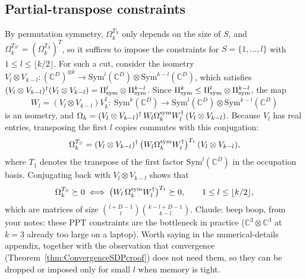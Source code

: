 \documentclass[aps,pra,twocolumn,showpacs,superscriptaddress,groupedaddress]{revtex4-2}
\newcommand{\claude}[1]{{\color{claudeorange} Claude: beep boop, #1}}
\newcommand{\C}{\mathds{C}}
\begin{document}
\begin{widetext}
\subsection{Partial-transpose constraints}
By permutation symmetry, $\Omega_k^{T_S}$ only depends on the size of $S$, and $\Omega_k^{T_{S^c}}=(\Omega_k^{T_S})^T$, so it suffices to impose the constraints for $S=\{1,\dots,l\}$ with $1\leq l\leq\lfloor k/2\rfloor$. For such a cut, consider the isometry $V_l\otimes V_{k-l}:(\C^D)^{\otimes k}\to\text{Sym}^l(\C^D)\otimes\text{Sym}^{k-l}(\C^D)$, which satisfies $(V_l\otimes V_{k-l})^\dagger(V_l\otimes V_{k-l})=\Pi^l_{\rm sym}\otimes\Pi^{k-l}_{\rm sym}$. Since $\Pi^k_{\rm sym}\leq\Pi^l_{\rm sym}\otimes\Pi^{k-l}_{\rm sym}$, the map
\begin{equation}
    W_l=(V_l\otimes V_{k-l})V_k^\dagger:\ \text{Sym}^k(\C^D)\to\text{Sym}^l(\C^D)\otimes\text{Sym}^{k-l}(\C^D)
\end{equation}
is an isometry, and $\Omega_k=(V_l\otimes V_{k-l})^\dagger\,W_l\Omega_k^{\rm sym}W_l^\dagger\,(V_l\otimes V_{k-l})$. Because $V_l$ has real entries, transposing the first $l$ copies commutes with this conjugation:
\begin{equation}
    \Omega_k^{T_S}=(V_l\otimes V_{k-l})^\dagger\,\big(W_l\Omega_k^{\rm sym}W_l^\dagger\big)^{T_1}\,(V_l\otimes V_{k-l}),
\end{equation}
where $T_1$ denotes the transpose of the first factor $\text{Sym}^l(\C^D)$ in the occupation basis. Conjugating back with $V_l\otimes V_{k-l}$ shows that
\begin{equation}
    \Omega_k^{T_S}\succeq0\iff\big(W_l\,\Omega_k^{\rm sym}W_l^\dagger\big)^{T_1}\succeq0,\qquad 1\leq l\leq\lfloor k/2\rfloor,
\end{equation}
which are matrices of size $\binom{l+D-1}{l}\binom{k-l+D-1}{k-l}$.
\claude{from your notes: these PPT constraints are the bottleneck in practice ($\C^3\otimes\C^3$ at $k=3$ already too large on a laptop). Worth saying in the numerical-details appendix, together with the observation that convergence (Theorem~\ref{thm:ConvergenceSDPcroof}) does not need them, so they can be dropped or imposed only for small $l$ when memory is tight.}


\end{widetext}
\end{document}
